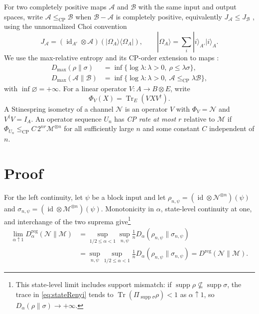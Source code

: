 \documentclass[11pt,letterpaper]{article}
\numberwithin{equation}{section}
\newcommand{\N}{\mathcal N}
\newcommand{\M}{\mathcal M}
\newcommand{\id}{\operatorname{id}}
\newcommand{\Tr}{\operatorname{Tr}}
\newcommand{\supp}{\operatorname{supp}}
\newcommand{\reg}{\mathrm{reg}}
\newcommand{\cp}{\mathrm{CP}}
\newcommand{\Dt}{D}
\begin{document}
For two completely positive maps $\mathcal A$ and $\mathcal B$ with the same input and output spaces, write $\mathcal A\le_{\cp}\mathcal B$ when $\mathcal B-\mathcal A$ is completely positive, equivalently $J_{\mathcal A}\le J_{\mathcal B}$ \cite{Choi}, using the unnormalized Choi convention
\begin{equation}\label{eq:choi}
 J_{\mathcal A}=(\id_{A'}\otimes\mathcal A)
                  (|\Omega_A\rangle\!\langle\Omega_A|),
 \qquad |\Omega_A\rangle=\sum_i|i\rangle_{A'}|i\rangle_A.
\end{equation}
We use the max-relative entropy \cite{Datta} and its CP-order extension to maps \cite[Eq.~(13)]{Gour}:
\begin{equation}\label{eq:Dmax}
 \begin{split}
 D_{\max}(\rho\|\sigma)&=\inf\{\log\lambda:\lambda>0,\ \rho\le\lambda\sigma\},\\
 D_{\max}(\mathcal A\|\mathcal B)&=\inf\{\log\lambda:\lambda>0,\ \mathcal A\le_{\cp}\lambda\mathcal B\},
 \end{split}
\end{equation}
with $\inf\varnothing=+\infty$.
For a linear operator $V:A\to B\otimes E$, write
\begin{equation}\label{eq:Phi}
 \Phi_V(X)=\Tr_E(VXV^\dagger).
\end{equation}
A Stinespring isometry of a channel $\N$ is an operator $V$ with $\Phi_V=\N$ and $V^\dagger V=I_A$.
An operator sequence $U_n$ has \emph{CP rate at most $r$} relative to $\M$ if
$\Phi_{U_n}\le_{\cp}C\,2^{nr}\M^{\otimes n}$ for all sufficiently large $n$ and some constant $C$ independent of $n$.


\section{Proof}\label{sec:proof}
For the left continuity, let $\psi$ be a block input and let $\rho_{n,\psi}=(\id\otimes\N^{\otimes n})(\psi)$ and $\sigma_{n,\psi}=(\id\otimes\M^{\otimes n})(\psi)$. Monotonicity in $\alpha$, state-level continuity at one, and interchange of the two suprema give\footnote{This state-level limit includes support mismatch: if $\supp\rho\not\subseteq\supp\sigma$, the trace in \eqref{eq:stateRenyi} tends to $\Tr(\Pi_{\supp\sigma}\rho)<1$ as $\alpha\uparrow1$, so $\Dt_\alpha(\rho\|\sigma)\to+\infty$.}
\begin{align*}
 \lim_{\alpha\uparrow1}\Dt_\alpha^{\reg}(\N\|\M)
 &=\sup_{1/2\le\alpha<1}\sup_{n,\psi}
       \frac1n\Dt_\alpha(\rho_{n,\psi}\|\sigma_{n,\psi})\\
 &=\sup_{n,\psi}\sup_{1/2\le\alpha<1}
       \frac1n\Dt_\alpha(\rho_{n,\psi}\|\sigma_{n,\psi})
 =D^{\reg}(\N\|\M).
\end{align*}
\end{document}
